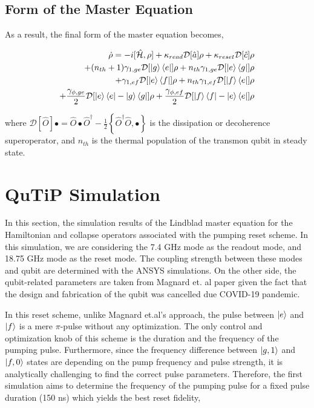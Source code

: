\subsection{Form of the Master Equation}

As a result, the final form of the master equation becomes,

\begin{equation} \begin{split}
	\Dot{\rho} = -i[\hat{\mathcal{H}},\rho] + \kappa_{read}\mathcal{D}[\hat{a}]\rho +  \kappa_{reset}\mathcal{D}[\hat{c}]\rho  \\
	+(n_{th}+1)\gamma_{1,ge}\mathcal{D}[\ket{g}\bra{e}]\rho + n_{th} \gamma_{1,ge}\mathcal{D}[\ket{e}\bra{g}]\rho\\
	+\gamma_{1,ef}\mathcal{D}[\ket{e}\bra{f}]\rho  + n_{th} \gamma_{1,ef}\mathcal{D}[\ket{f}\bra{e}]\rho \\
	+ \frac{\gamma_{\phi,ge}}{2} \mathcal{D}[\ket{e}\bra{e}-\ket{g}\bra{g}]\rho + \frac{\gamma_{\phi,ef}}{2} \mathcal{D}[\ket{f}\bra{f}-\ket{e}\bra{e}]\rho
	\end{split}
\end{equation}

where $\mathcal{D}[\hat{O}] \bullet = \hat{O} \bullet \hat{O}^\dagger - \frac{1}{2}\left\{\hat{O}^\dagger \hat{O}, \bullet \right\}$ is the dissipation or decoherence superoperator, and $n_{th}$ is the thermal population of the transmon qubit in steady state. 

\section{QuTiP Simulation}

In this section, the simulation results of the Lindblad master equation for the Hamiltonian and collapse operators associated with the pumping reset scheme. In this simulation, we are considering the 7.4 GHz mode as the readout mode, and 18.75 GHz mode as the reset mode. The coupling strength between these modes and qubit are determined with the ANSYS simulations. On the other side, the qubit-related parameters are taken from Magnard et. al paper \cite{Magnard} given the fact that the design and fabrication of the qubit was cancelled due COVID-19 pandemic. 

\vspace{2 mm}

In this reset scheme, unlike Magnard et.al's approach, the pulse between $\ket{e}$ and $\ket{f}$ is a mere $\pi$-pulse without any optimization. The only control and optimization knob of this scheme is the duration and the frequency of the pumping pulse. Furthermore, since the frequency difference between $\ket{g,1}$ and  $\ket{f,0}$ states are depending on the pump frequency and pulse strength, it is analytically challenging to find the correct pulse parameters. Therefore, the first simulation aims to determine the frequency of the pumping pulse for a fixed pulse duration (150 ns) which yields the best reset fidelity, 

